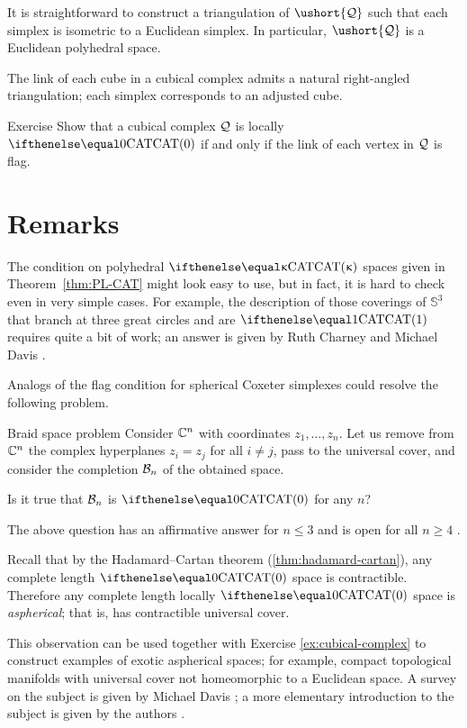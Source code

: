 It is straightforward to construct a triangulation 
of $\ushort{\spc{Q}}$ 
such that each simplex is isometric to a Euclidean simplex.
In particular, $\ushort{\spc{Q}}$ is a Euclidean polyhedral space.

The link of each cube in a cubical complex admits a natural right-angled triangulation; 
each simplex corresponds to an adjusted cube.

\begin{thm}{Exercise}\label{ex:cubical-complex}
Show that a cubical complex $\mathcal{Q}$ is locally $\CAT0$ if and only if the link of each vertex in $\mathcal{Q}$ is flag.
\end{thm}

\section{Remarks}\label{sec:poly-reamarks}

The condition on polyhedral $\CAT\kappa$ spaces given in Theorem~\ref{thm:PL-CAT} might look easy to use, 
but in fact, it is hard to check even in very simple cases.
For example, the description of those coverings of $\mathbb{S}^3$ that branch at three 
great circles and are $\CAT1$ requires quite a bit of work;
an answer is given by Ruth Charney and Michael Davis \cite{charney-davis-1993}.

Analogs of the flag condition for spherical Coxeter simplexes
could resolve the following problem. 

\begin{thm}{Braid space problem}
Consider $\mathbb{C}^n$ with coordinates $z_1,\dots,z_n$.
Let us remove from $\mathbb{C}^n$ the complex hyperplanes $z_i=z_j$ for all $i\ne j$,
pass to the universal cover, and consider the completion $\mathcal{B}_n$ 
of the obtained space.

Is it true that $\mathcal{B}_n$ is $\CAT0$ for any $n$?
\end{thm}

The above question has an affirmative answer for $n\le 3$ and is open for all $n\ge 4$ \cite{charney-davis-1993,panov-petrunin}.

Recall that by the Hadamard--Cartan theorem (\ref{thm:hadamard-cartan}), 
any complete length $\CAT{0}$ space is contractible.
Therefore any complete length locally $\CAT{0}$ space 
is \emph{aspherical};
that is, has contractible universal cover.

This observation can be used together with Exercise \ref{ex:cubical-complex} to construct examples of exotic aspherical spaces;
for example, compact topological manifolds with universal cover not homeomorphic to a Euclidean space.
A survey on the subject is given by Michael Davis \cite{davis-2001}; a more elementary introduction to the subject is given by the authors \cite[Chapter 3]{alexander-kapovitch-petrunin-CAT}.

